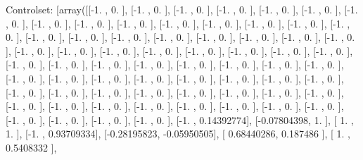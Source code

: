 \documentclass{article}
\begin{document}
Controlset: [array([[-1.        ,  0.        ],
       [-1.        ,  0.        ],
       [-1.        ,  0.        ],
       [-1.        ,  0.        ],
       [-1.        ,  0.        ],
       [-1.        ,  0.        ],
       [-1.        ,  0.        ],
       [-1.        ,  0.        ],
       [-1.        ,  0.        ],
       [-1.        ,  0.        ],
       [-1.        ,  0.        ],
       [-1.        ,  0.        ],
       [-1.        ,  0.        ],
       [-1.        ,  0.        ],
       [-1.        ,  0.        ],
       [-1.        ,  0.        ],
       [-1.        ,  0.        ],
       [-1.        ,  0.        ],
       [-1.        ,  0.        ],
       [-1.        ,  0.        ],
       [-1.        ,  0.        ],
       [-1.        ,  0.        ],
       [-1.        ,  0.        ],
       [-1.        ,  0.        ],
       [-1.        ,  0.        ],
       [-1.        ,  0.        ],
       [-1.        ,  0.        ],
       [-1.        ,  0.        ],
       [-1.        ,  0.        ],
       [-1.        ,  0.        ],
       [-1.        ,  0.        ],
       [-1.        ,  0.        ],
       [-1.        ,  0.        ],
       [-1.        ,  0.        ],
       [-1.        ,  0.        ],
       [-1.        ,  0.        ],
       [-1.        ,  0.        ],
       [-1.        ,  0.        ],
       [-1.        ,  0.        ],
       [-1.        ,  0.        ],
       [-1.        ,  0.        ],
       [-1.        ,  0.        ],
       [-1.        ,  0.        ],
       [-1.        ,  0.        ],
       [-1.        ,  0.        ],
       [-1.        ,  0.        ],
       [-1.        ,  0.        ],
       [-1.        ,  0.        ],
       [-1.        ,  0.        ],
       [-1.        ,  0.        ],
       [-1.        ,  0.        ],
       [-1.        ,  0.        ],
       [-1.        ,  0.        ],
       [-1.        ,  0.        ],
       [-1.        ,  0.        ],
       [-1.        ,  0.        ],
       [-1.        ,  0.        ],
       [-1.        ,  0.        ],
       [-1.        ,  0.        ],
       [-1.        ,  0.        ],
       [-1.        ,  0.        ],
       [-1.        ,  0.        ],
       [-1.        ,  0.        ],
       [-1.        ,  0.        ],
       [-1.        ,  0.        ],
       [-1.        ,  0.        ],
       [-1.        ,  0.        ],
       [-1.        ,  0.14392774],
       [-0.07804398,  1.        ],
       [ 1.        ,  1.        ],
       [-1.        ,  0.93709334],
       [-0.28195823, -0.05950505],
       [ 0.68440286,  0.187486  ],
       [ 1.        ,  0.5408332 ],
\end{document}
